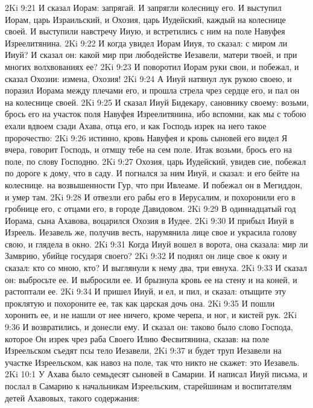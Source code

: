 \vs 2Ki 9:21 И сказал Иорам: запрягай. И запрягли колесницу его. И выступил Иорам, царь Израильский, и Охозия, царь Иудейский, каждый на колеснице своей. И выступили навстречу Ииую, и встретились с ним на поле Навуфея Изреелитянина.
\vs 2Ki 9:22 И когда увидел Иорам Ииуя, то сказал: с миром ли Ииуй? И сказал он: какой мир при любодействе Иезавели, матери твоей, и при многих волхвованиях ее?
\vs 2Ki 9:23 И поворотил Иорам руки свои, и побежал, и сказал Охозии: измена, Охозия!
\vs 2Ki 9:24 А Ииуй натянул лук рукою своею, и поразил Иорама между плечами его, и прошла стрела чрез сердце его, и пал он на колеснице своей.
\vs 2Ki 9:25 И сказал Ииуй Бидекару, сановнику своему: возьми, брось его на участок поля Навуфея Изреелитянина, ибо вспомни, как мы с тобою ехали вдвоем сзади Ахава, отца его, и как Господь изрек на него такое пророчество:
\vs 2Ki 9:26 истинно, кровь Навуфея и кровь сыновей его видел Я вчера, говорит Господь, и отмщу тебе на сем поле. Итак возьми, брось его на поле, по слову Господню.
\vs 2Ki 9:27 Охозия, царь Иудейский, увидев сие, побежал по дороге к дому, что в саду. И погнался за ним Ииуй, и сказал: и его бейте на колеснице.  на возвышенности Гур, что при Ивлеаме. И побежал он в Мегиддон, и умер там.
\vs 2Ki 9:28 И отвезли его рабы его в Иерусалим, и похоронили его в гробнице его, с отцами его, в городе Давидовом.
\rsbpar\vs 2Ki 9:29 В одиннадцатый год Иорама, сына Ахавова, воцарился Охозия в Иудее.
\vs 2Ki 9:30 И прибыл Ииуй в Изреель. Иезавель же, получив весть, нарумянила лице свое и украсила голову свою, и глядела в окно.
\vs 2Ki 9:31 Когда Ииуй вошел в ворота, она сказала: мир ли Замврию, убийце государя своего?
\vs 2Ki 9:32 И поднял он лице свое к окну и сказал: кто со мною, кто? И выглянули к нему два, три евнуха.
\vs 2Ki 9:33 И сказал он: выбросьте ее. И выбросили ее. И брызнула кровь ее на стену и на коней, и растоптали ее.
\vs 2Ki 9:34 И пришел Ииуй, и ел, и пил, и сказал: отыщите эту проклятую и похороните ее, так как царская дочь она.
\vs 2Ki 9:35 И пошли хоронить ее, и не нашли от нее ничего, кроме черепа, и ног, и кистей рук.
\vs 2Ki 9:36 И возвратились, и донесли ему. И сказал он: таково было слово Господа, которое Он изрек чрез раба Своего Илию Фесвитянина, сказав: на поле Изреельском съедят псы тело Иезавели,
\vs 2Ki 9:37 и будет труп Иезавели на участке Изреельском, как навоз на поле, так что никто не скажет: это Иезавель.
\vs 2Ki 10:1 У Ахава было семьдесят сыновей в Самарии. И написал Ииуй письма, и послал в Самарию к начальникам Изреельским, старейшинам и воспитателям детей Ахавовых, такого содержания:
